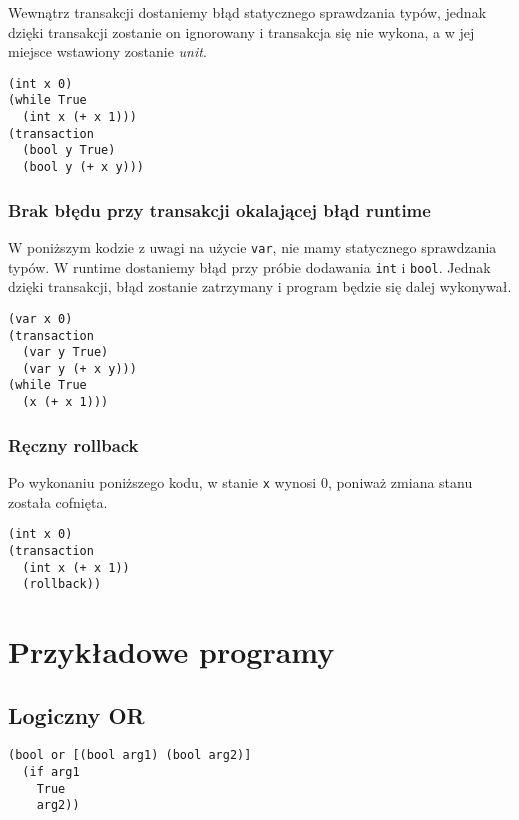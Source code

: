 \documentclass{article}
\begin{document}
Wewnątrz transakcji dostaniemy błąd statycznego sprawdzania typów, jednak dzięki transakcji zostanie on ignorowany i transakcja się nie wykona, a w jej miejsce wstawiony zostanie \textit{unit}.

\begin{lstlisting}
(int x 0)
(while True
  (int x (+ x 1)))
(transaction
  (bool y True)
  (bool y (+ x y)))
\end{lstlisting}

\subsubsection{Brak błędu przy transakcji okalającej błąd runtime}

W poniższym kodzie z uwagi na użycie \texttt{var}, nie mamy statycznego sprawdzania typów. W runtime dostaniemy błąd przy próbie dodawania \texttt{int} i \texttt{bool}. Jednak dzięki transakcji, błąd zostanie zatrzymany i program będzie się dalej wykonywał.

\begin{lstlisting}
(var x 0)
(transaction
  (var y True)
  (var y (+ x y)))
(while True
  (x (+ x 1)))
\end{lstlisting}

\subsubsection{Ręczny rollback}

Po wykonaniu poniższego kodu, w stanie \texttt{x} wynosi 0, poniważ zmiana stanu została cofnięta.

\begin{lstlisting}
(int x 0)
(transaction
  (int x (+ x 1))
  (rollback))
\end{lstlisting}

\pagebreak

\section{Przykładowe programy}

\subsection{Logiczny OR}

\begin{lstlisting}
(bool or [(bool arg1) (bool arg2)]
  (if arg1
    True
    arg2))
\end{lstlisting}
\end{document}
